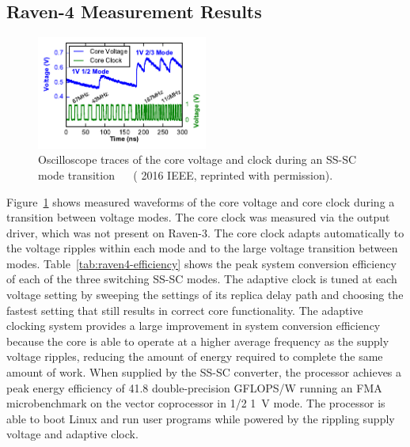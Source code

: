 \documentclass[graybox]{svmult}
\begin{document}
\subsection{Raven-4 Measurement Results}


\begin{figure}
  \centering
  \includegraphics[width=0.5\textwidth]{6-raven4-waveforms}
  \caption{Oscilloscope traces of the core voltage and clock during an SS-SC mode transition~\cite{Keller2017} ~\cite{Keller2016} ({\textcopyright} 2016 IEEE, reprinted with permission).}
  \label{fig:6-raven4-waveforms}
\end{figure}

Figure~\ref{fig:6-raven4-waveforms} shows measured waveforms of the core voltage and core clock during a transition between voltage modes.
The core clock was measured via the output driver, which was not present on Raven-3.
The core clock adapts automatically to the voltage ripples within each mode and to the large voltage transition between modes.
Table~\ref{tab:raven4-efficiency} shows the peak system conversion efficiency of each of the three switching SS-SC modes.
The adaptive clock is tuned at each voltage setting by sweeping the settings of its replica delay path and choosing the fastest setting that still results in correct core functionality.
The adaptive clocking system provides a large improvement in system conversion efficiency because the core is able to operate at a higher average frequency as the supply voltage ripples, reducing the amount of energy required to complete the same amount of work.
When supplied by the SS-SC converter, the processor achieves a peak energy efficiency of 41.8 double-precision GFLOPS/W running an FMA microbenchmark on the vector coprocessor in 1/2 \SI{1}{\volt} mode.
The processor is able to boot Linux and run user programs while powered by the rippling supply voltage and adaptive clock.
\end{document}
